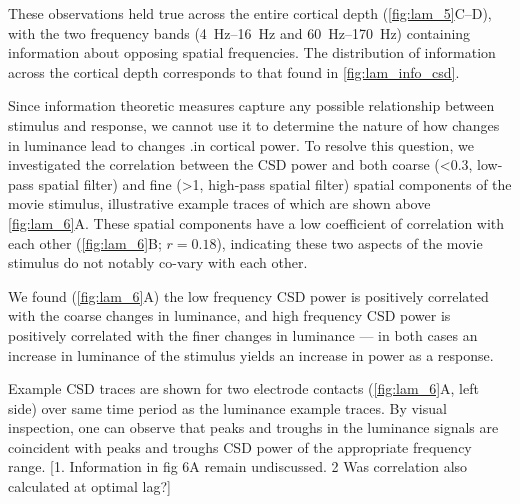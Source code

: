 These observations held true across the entire cortical depth (\autoref{fig:lam_5}C--D), with the two frequency bands (\SIrange{4}{16}{Hz} and \SIrange{60}{170}{Hz}) containing information about opposing spatial frequencies.
The distribution of information across the cortical depth corresponds to that found in \autoref{fig:lam_info_csd}.

Since information theoretic measures capture any possible relationship between stimulus and response, we cannot use it to determine the nature of how changes in luminance lead to changes .in cortical power.
To resolve this question, we investigated the correlation between the \ac{CSD} power and both coarse (\SI{<0.3}{\cpd}, low-pass spatial filter) and fine (\SI{>1}{\cpd}, high-pass spatial filter) spatial components of the movie stimulus, illustrative example traces of which are shown above \autoref{fig:lam_6}A.
These spatial components have a low coefficient of correlation with each other (\autoref{fig:lam_6}B; $r=0.18$), indicating these two aspects of the movie stimulus do not notably co-vary with each other.

We found (\autoref{fig:lam_6}A) the low frequency \ac{CSD} power is positively correlated with the coarse changes in luminance, and high frequency \ac{CSD} power is positively correlated with the finer changes in luminance --- in both cases an increase in luminance of the stimulus yields an increase in power as a response.

Example \ac{CSD} traces are shown for two electrode contacts (\autoref{fig:lam_6}A, left side) over same time period as the luminance example traces.
By visual inspection, one can observe that peaks and troughs in the luminance signals are coincident with peaks and troughs \ac{CSD} power of the appropriate frequency range.
[1. Information in fig 6A remain undiscussed. 2 Was correlation also calculated at optimal lag?]

